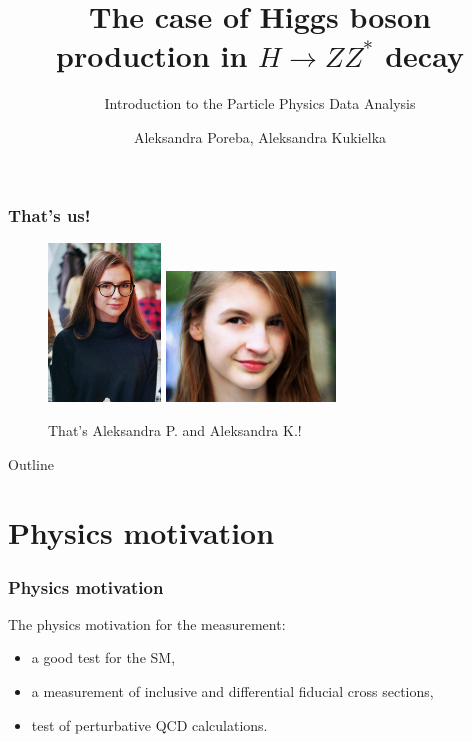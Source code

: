 \documentclass[aspectratio=1610, english]{beamer}
\author[Aleksandra Poreba, Aleksandra Kukielka]{Aleksandra Poreba, Aleksandra Kukielka}
\date{}
\title[The $H \rightarrow ZZ^{*}$ decay analysis]{The case of Higgs boson production in $H \rightarrow ZZ^{*}$ decay}
\subtitle{Introduction to the Particle Physics Data Analysis}
\begin{document}
\maketitle

\begin{frame}
\frametitle{That's us!}

\begin{figure} [H]
\centering
\includegraphics[width=3cm]{zdj1.png} \quad \quad
\includegraphics[width=4.5cm]{zdj2.png}
\caption{ That's Aleksandra P. and Aleksandra K.!}
\end{figure}

\end{frame}

\begin{frame}{Outline}
	\tableofcontents
\end{frame}

\section{Physics motivation}

\begin{frame}
\frametitle{Physics motivation}
The physics motivation for the measurement:
\begin{itemize}
\item a good test for the SM,
\item a measurement of inclusive and differential fiducial cross sections,
\item test of perturbative QCD calculations.
\end{itemize}

\end{frame}
\end{document}
